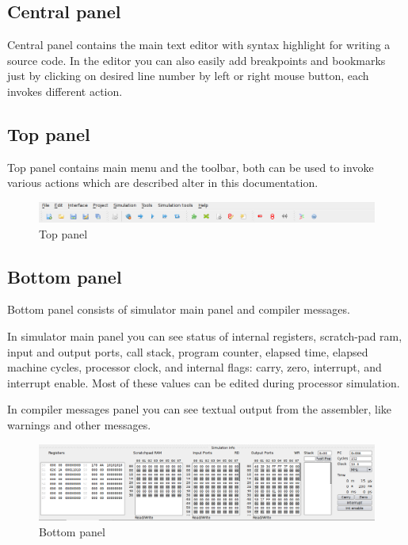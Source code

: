     \subsection{Central panel}
        Central panel contains the main text editor with syntax highlight for writing a source code. In the editor you can also easily add breakpoints and bookmarks just by clicking on desired line number by left or right mouse button, each invokes different action.

    \subsection{Top panel}
        Top panel contains main menu and the toolbar, both can be used to invoke various actions which are described alter in this documentation.

        \begin{figure}[h!]
            \centering
            \includegraphics[width=.9\textwidth]{img/top_panel.png}
            \caption{Top panel}
        \end{figure}

    \subsection{Bottom panel}
        Bottom panel consists of simulator main panel and compiler messages.

        In simulator main panel you can see status of internal registers, scratch-pad ram, input and output ports, call
        stack, program counter, elapsed time, elapsed machine cycles, processor clock, and internal flags: carry, zero, interrupt, and interrupt enable. Most of these values can be edited during processor simulation.

        In compiler messages panel you can see textual output from the assembler, like warnings and other messages.

        \begin{figure}[h!]
            \centering
            \includegraphics[width=.9\textwidth]{img/bottom_panel.png}
            \caption{Bottom panel}
        \end{figure}

